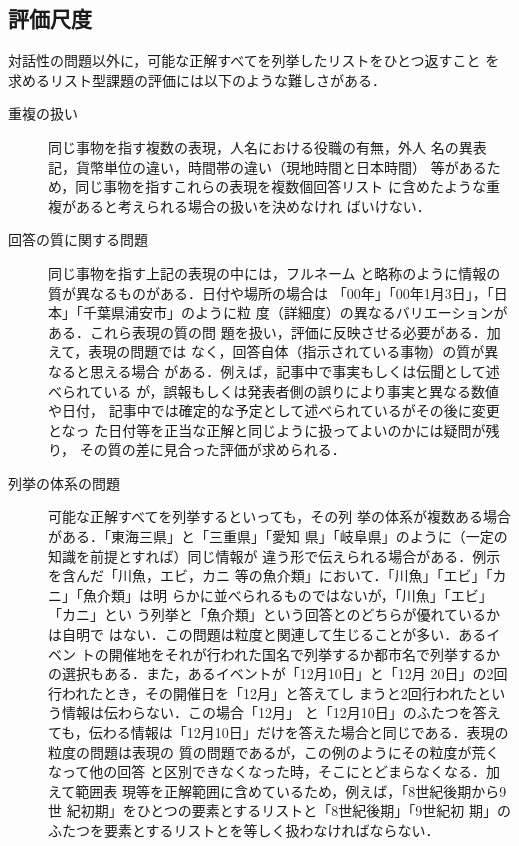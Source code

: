 \documentclass[japanese]{jnlp_1.4}
\begin{document}
\subsection{評価尺度} \label{Sec3_2}

対話性の問題以外に，可能な正解すべてを列挙したリストをひとつ返すこと
を求めるリスト型課題の評価には以下のような難しさがある\cite{KatoJ04b}．

\begin{description}
\item[重複の扱い]同じ事物を指す複数の表現，人名における役職の有無，外人
	   名の異表記，貨幣単位の違い，時間帯の違い（現地時間と日本時間）
	   等があるため，同じ事物を指すこれらの表現を複数個回答リスト
	   に含めたような重複があると考えられる場合の扱いを決めなけれ
	   ばいけない．
\item[回答の質に関する問題]同じ事物を指す上記の表現の中には，フルネーム
	   と略称のように情報の質が異なるものがある．日付や場所の場合は
	   「00年」「00年1月3日」，「日本」「千葉県浦安市」のように粒
	   度（詳細度）の異なるバリエーションがある．これら表現の質の問
	   題を扱い，評価に反映させる必要がある．加えて，表現の問題では
	   なく，回答自体（指示されている事物）の質が異なると思える場合
	   がある．例えば，記事中で事実もしくは伝聞として述べられている
	   が，誤報もしくは発表者側の誤りにより事実と異なる数値や日付，
	   記事中では確定的な予定として述べられているがその後に変更となっ
	   た日付等を正当な正解と同じように扱ってよいのかには疑問が残り，
	   その質の差に見合った評価が求められる．
\item[列挙の体系の問題]可能な正解すべてを列挙するといっても，その列
	   挙の体系が複数ある場合がある．「東海三県」と「三重県」「愛知
	   県」「岐阜県」のように（一定の知識を前提とすれば）同じ情報が
	   違う形で伝えられる場合がある．例示を含んだ「川魚，エビ，カニ
	   等の魚介類」において．「川魚」「エビ」「カニ」「魚介類」は明
	   らかに並べられるものではないが，「川魚」「エビ」「カニ」とい
	   う列挙と「魚介類」という回答とのどちらが優れているかは自明で
	   はない．この問題は粒度と関連して生じることが多い．あるイベン
	   トの開催地をそれが行われた国名で列挙するか都市名で列挙するか
	   の選択もある．また，あるイベントが「12月10日」と「12月
	   20日」の2回行われたとき，その開催日を「12月」と答えてし
	   まうと2回行われたという情報は伝わらない．この場合「12月」
	   と「12月10日」のふたつを答えても，伝わる情報は「12月10日」だけを答えた場合と同じである．表現の粒度の問題は表現の
	   質の問題であるが，この例のようにその粒度が荒くなって他の回答
	   と区別できなくなった時，そこにとどまらなくなる．加えて範囲表
	   現等を正解範囲に含めているため，例えば，「8世紀後期から9世
	   紀初期」をひとつの要素とするリストと「8世紀後期」「9世紀初
	   期」のふたつを要素とするリストとを等しく扱わなければならない．
\end{description}
\end{document}
